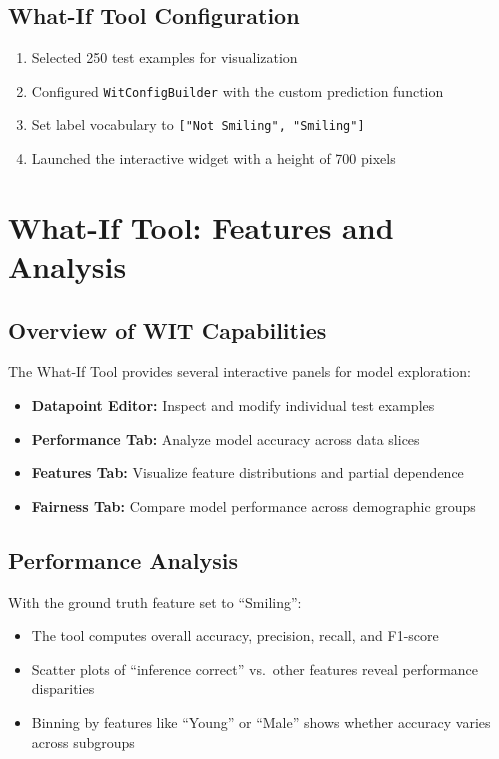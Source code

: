 \documentclass[12pt,a4paper]{article}
\begin{document}
\subsection{What-If Tool Configuration}
\begin{enumerate}
    \item Selected 250 test examples for visualization
    \item Configured \texttt{WitConfigBuilder} with the custom prediction function
    \item Set label vocabulary to \texttt{["Not Smiling", "Smiling"]}
    \item Launched the interactive widget with a height of 700 pixels
\end{enumerate}

\section{What-If Tool: Features and Analysis}

\subsection{Overview of WIT Capabilities}
The What-If Tool provides several interactive panels for model exploration:

\begin{itemize}
    \item \textbf{Datapoint Editor:} Inspect and modify individual test examples
    \item \textbf{Performance Tab:} Analyze model accuracy across data slices
    \item \textbf{Features Tab:} Visualize feature distributions and partial dependence
    \item \textbf{Fairness Tab:} Compare model performance across demographic groups
\end{itemize}

\subsection{Performance Analysis}
With the ground truth feature set to ``Smiling'':
\begin{itemize}
    \item The tool computes overall accuracy, precision, recall, and F1-score
    \item Scatter plots of ``inference correct'' vs.\ other features reveal performance disparities
    \item Binning by features like ``Young'' or ``Male'' shows whether accuracy varies across subgroups
\end{itemize}
\end{document}
